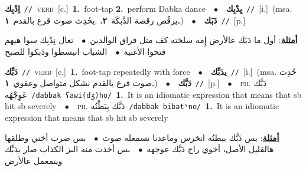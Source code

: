 \documentclass[10pt,a4paper,twoside]{article} %
\begin{document}
\begin{multicols}{2}
{{{{{\setlength\topsep{0pt}\textbf{\foreignlanguage{arabic}{اِدْبِك}}\ {\color{gray}\texttt{//}\color{black}}\ \textsc{verb}\ [c.]\ \textbf{1.}~foot-tap  \textbf{2.}~perform Dabka dance\ \ $\bullet$\ \ \setlength\topsep{0pt}\textbf{\foreignlanguage{arabic}{يِدْبِك}}\ {\color{gray}\texttt{//}\color{black}}\ [i.]\ \color{gray}(msa. \foreignlanguage{arabic}{يرقُص رقصة الدَّبكَة}~\foreignlanguage{arabic}{\textbf{٢.}}  .\foreignlanguage{arabic}{يحُدِث صوت قرع بالقدم}~\foreignlanguage{arabic}{\textbf{١.}})\color{black}\ \ $\bullet$\ \ \setlength\topsep{0pt}\textbf{\foreignlanguage{arabic}{دَبَك}}\ {\color{gray}\texttt{//}\color{black}}\ [p.]\  \begin{flushright}\color{gray}\foreignlanguage{arabic}{\textbf{\underline{\foreignlanguage{arabic}{أمثلة}}}: أول ما دَبَك عالأرض إِمه سلخته كف مثل فراق الوالدين\ $\bullet$\ \  تعال نِدْبِك سوا هيهم فتحوا الأغنية\ $\bullet$\ \  الشباب انبسطوا ودَبكوا للصبح}\end{flushright}\color{black}} \vspace{2mm}

{\setlength\topsep{0pt}\textbf{\foreignlanguage{arabic}{دَبِّك}}\ {\color{gray}\texttt{//}\color{black}}\ \textsc{verb}\ [c.]\ \textbf{1.}~foot-tap repeatedly with force\ \ $\bullet$\ \ \setlength\topsep{0pt}\textbf{\foreignlanguage{arabic}{يدَبِّك}}\ {\color{gray}\texttt{//}\color{black}}\ [i.]\ \color{gray}(msa. \foreignlanguage{arabic}{حُدِث صوت قرع بالقدم بشكل متواصل وعقوي}~\foreignlanguage{arabic}{\textbf{١.}})\color{black}\ \ $\bullet$\ \ \setlength\topsep{0pt}\textbf{\foreignlanguage{arabic}{دَبَّك}}\ {\color{gray}\texttt{//}\color{black}}\ [p.]\ \ $\bullet$\ \ \textsc{ph.} \color{gray} \foreignlanguage{arabic}{دَبَّك عَوِجْهُه}\color{black}\ {\color{gray}\texttt{/{\sffamily dabbak ʕawi(dʒ)ho}/}\color{black}}\ \textbf{1.}~It is an idiomatic expression that means that sb hit sb severely\ \ $\bullet$\ \ \textsc{ph.} \color{gray} \foreignlanguage{arabic}{دَبَّك بِبَطْنُه}\color{black}\ {\color{gray}\texttt{/{\sffamily dabbak bibatˤno}/}\color{black}}\ \textbf{1.}~It is an idiomatic expression that means that sb hit sb severely\  \begin{flushright}\color{gray}\foreignlanguage{arabic}{\textbf{\underline{\foreignlanguage{arabic}{أمثلة}}}: بس دَبَّك ببطنُه انخرس وماعدنا نسمعله صوت\ $\bullet$\ \  بس ضرب أختي وطلقها هالقليل الأصل، أخوي راح دَبَّك عوجهه\ $\bullet$\ \  بس أخذت منه البز الكذاب صار يدَبِّك ويتمعمل عالأرض}\end{flushright}\color{black}} \vspace{2mm}

}}}}
\end{multicols}
\end{document}
